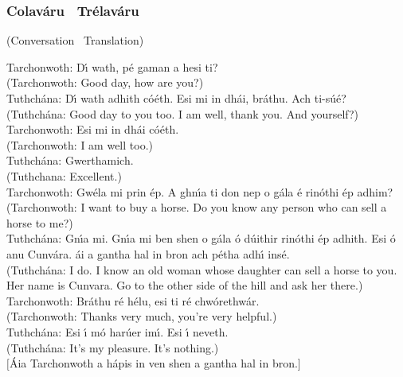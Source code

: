 \newpage
\subsubsection{Colav\'{a}ru \textendash\ Tr\'{e}lav\'{a}ru}
(Conversation \textendash\ Translation)

Tarchonwoth: D\'{\i} wath, p\'{e} gaman a hesi ti?\\
(Tarchonwoth: Good day, how are you?)\\

Tuthch\'{a}na: D\'{\i} wath adhith c\'{o}\'{e}th. Esi mi in dh\'{a}i, br\'{a}thu. Ach ti-s\'{u}\'{e}?\\
(Tuthch\'{a}na: Good day to you too. I am well, thank you. And yourself?)\\

Tarchonwoth: Esi mi in dh\'{a}i c\'{o}\'{e}th.\\
(Tarchonwoth: I am well too.)\\

Tuthch\'{a}na: Gwerthamich.\\
(Tuthchana: Excellent.)\\

Tarchonwoth: Gw\'{e}la mi prin \'{e}p. A ghn\'{\i}a ti don nep o g\'{a}la \'{e} rin\'{o}thi \'{e}p adhim?\\
(Tarchonwoth: I want to buy a horse. Do you know any person who can sell a horse to me?)\\

Tuthch\'{a}na: Gn\'{\i}a mi. Gn\'{\i}a mi ben shen o g\'{a}la \'{o} d\'{u}ithir rin\'{o}thi \'{e}p adhith. Esi \'{o} anu Cunv\'{a}ra. \'{a}i a gantha hal in bron ach p\'{e}tha adh\'{\i} ins\'{e}.\\
(Tuthch\'{a}na: I do. I know an old woman whose daughter can sell a horse to you. Her name is Cunvara. Go to the other side of the hill and ask her there.)\\

Tarchonwoth: Br\'{a}thu r\'{e} h\'{e}lu, esi ti r\'{e} chw\'{o}rethw\'{a}r.\\
(Tarchonwoth: Thanks very much, you're very helpful.)\\

Tuthch\'{a}na: Esi \'{\i} m\'{o} har\'{u}er im\'{\i}. Esi \'{\i} neveth.\\
(Tuthch\'{a}na: It's my pleasure. It's nothing.)\\

$[$\'{A}ia Tarchonwoth a h\'{a}pis in ven shen a gantha hal in bron.$]$\\

